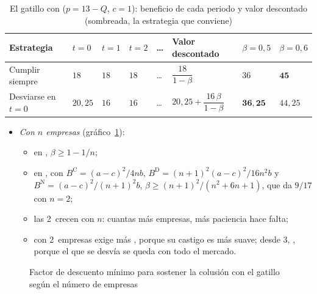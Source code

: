 \documentclass[11pt]{article}
\begin{document}
\begin{table}[H]
\centering
\caption{El gatillo con  ($p=13-Q$, $c=1$): beneficio de cada periodo y valor descontado (sombreada, la estrategia que conviene)}\label{tab:gatillo-senda}
\begin{tabular}{>{\raggedright\arraybackslash}m{3.2cm}>{\centering\arraybackslash}m{1.0cm}>{\centering\arraybackslash}m{1.0cm}>{\centering\arraybackslash}m{1.0cm}>{\centering\arraybackslash}m{0.6cm}>{\centering\arraybackslash}m{2.9cm}>{\centering\arraybackslash}m{1.4cm}>{\centering\arraybackslash}m{1.4cm}}
\toprule
\rowcolor{tceeazulpalido}\textbf{Estrategia} & $t=0$ & $t=1$ & $t=2$ & … & \textbf{Valor descontado} & $\beta=0{,}5$ & $\beta=0{,}6$\\
\midrule
Cumplir siempre & $18$ & $18$ & $18$ & … & $\dfrac{18}{1-\beta}$ & $36$ & \cellcolor{tceesalvia}$\mathbf{45}$\\
\addlinespace[0.3em]
Desviarse en $t=0$ & \textcolor{tceeverde}{$20{,}25$} & \textcolor{tceerojo}{$16$} & \textcolor{tceerojo}{$16$} & … & $20{,}25+\dfrac{16\,\beta}{1-\beta}$ & \cellcolor{tceesalvia}$\mathbf{36{,}25}$ & $44{,}25$\\
\bottomrule
\end{tabular}
\end{table}

\begin{itemize}
\item \emph{Con $n$ empresas} (gráfico~\ref{fig:colusion-beta-n}):
  \begin{itemize}
  \item en , $\beta\geq1-1/n$;
  \item en , con $B^{\mathrm C}=(a-c)^2/4nb$, $B^{\mathrm D}=(n+1)^2(a-c)^2/16n^2b$ y $B^{\mathrm N}=(a-c)^2/(n+1)^2b$, $\beta\geq(n+1)^2/(n^2+6n+1)$, que da $9/17$ con $n=2$;
  \item las 2~crecen con $n$: cuantas más empresas, más paciencia hace falta;
  \item con 2~empresas exige más , porque su castigo es más suave; desde 3, , porque el que se desvía se queda con todo el mercado.\findemo
  \end{itemize}
\end{itemize}

\begin{figure}[H]
\centering
\caption{Factor de descuento mínimo para sostener la colusión con el gatillo según el número de empresas}\label{fig:colusion-beta-n}
\end{figure}
\end{document}
